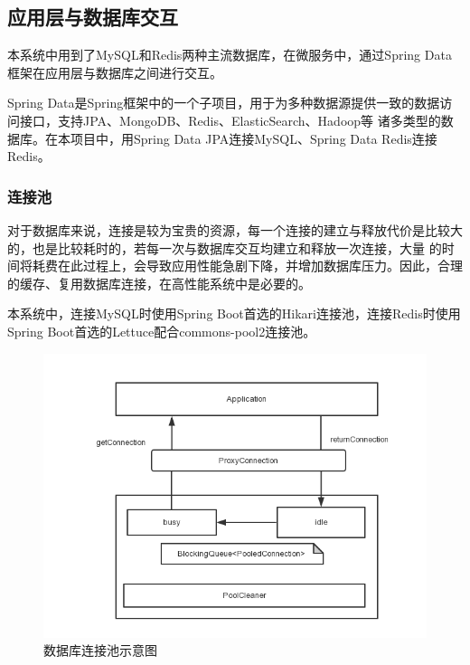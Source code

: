 \documentclass[titlepage,UTF8,linespread=1.5]{ctexart}
\begin{document}
\subsection{应用层与数据库交互}
本系统中用到了MySQL和Redis两种主流数据库，在微服务中，通过Spring Data框架在应用层与数据库之间进行交互。\par
Spring Data是Spring框架中的一个子项目，用于为多种数据源提供一致的数据访问接口，支持JPA、MongoDB、Redis、ElasticSearch、Hadoop等
诸多类型的数据库。在本项目中，用Spring Data JPA连接MySQL、Spring Data Redis连接Redis。\par
\subsubsection{连接池}
对于数据库来说，连接是较为宝贵的资源，每一个连接的建立与释放代价是比较大的，也是比较耗时的，若每一次与数据库交互均建立和释放一次连接，大量
的时间将耗费在此过程上，会导致应用性能急剧下降，并增加数据库压力。因此，合理的缓存、复用数据库连接，在高性能系统中是必要的。\par
本系统中，连接MySQL时使用Spring Boot首选的Hikari连接池，连接Redis时使用Spring Boot首选的Lettuce配合commons-pool2连接池。\par
\begin{figure}[H]
    \centering
    \includegraphics[width=130mm]{flow-struct-db-connect-pool.png}
    \caption{数据库连接池示意图}
    \label{fig:flow-struct-db-connect-pool}
\end{figure}
\end{document}
